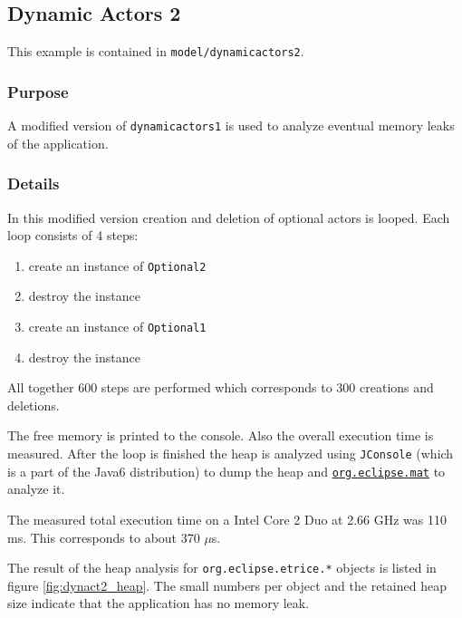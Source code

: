 \subsection{Dynamic Actors 2}

This example is contained in \texttt{model/dynamicactors2}.

\subsubsection{Purpose}

A modified version of \texttt{dynamicactors1} is used to analyze eventual memory leaks of the application.

\subsubsection{Details}

In this modified version creation and deletion of optional actors is looped.
Each loop consists of 4 steps:

\begin{enumerate}
\item create an instance of \texttt{Optional2}
\item destroy the instance
\item create an instance of \texttt{Optional1}
\item destroy the instance
\end{enumerate}

All together 600 steps are performed which corresponds to 300 creations and deletions.

The free memory is printed to the console. Also the overall execution time is measured.
After the loop is finished the heap is analyzed using \texttt{JConsole} (which is a part
of the Java6 distribution) to dump the heap and
\href{http://www.eclipse.org/mat/}{\texttt{org.eclipse.mat}} to analyze it.

The measured total execution time on a Intel Core 2 Duo at 2.66 GHz was 110 ms.
This corresponds to about 370 $\mu$s.

The result of the heap analysis for \texttt{org.eclipse.etrice.*} objects is listed in figure \ref{fig:dynact2_heap}.
The small numbers per object and the retained heap size indicate that the application has no memory leak.

